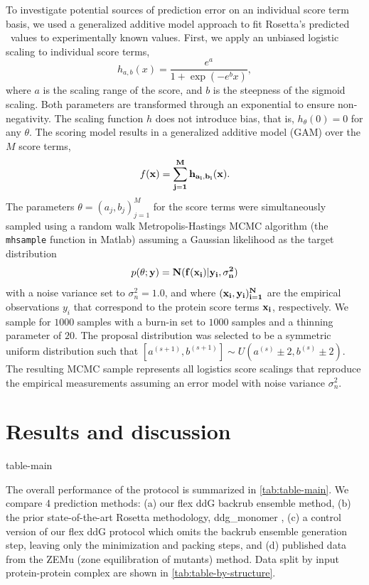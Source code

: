 To investigate potential sources of prediction error on an individual score term basis, we used a generalized additive model\cite{hastie_generalized_1990} approach to fit Rosetta's predicted \ddg\ values to experimentally known values.
First, we apply an unbiased logistic scaling to individual score terms,
$$h_{a,b}(x) = \frac{e^{a}}{1 + \exp(- e^{b} x)},$$
where $a$ is the scaling range of the score, and $b$ is the steepness of the sigmoid scaling. Both parameters are transformed through an exponential to ensure non-negativity. The scaling function $h$ does not introduce bias, that is, $h_\theta(0) = 0$ for any $\theta$. The scoring model results in a generalized additive model (GAM) over the $M$ score terms,
$$f(\bf{x}) = \sum_{j=1}^M h_{a_i,b_i}(x).$$
The parameters $\theta = (a_j,b_j)_{j=1}^M$ for the score terms were simultaneously sampled using a random walk Metropolis-Hastings MCMC algorithm (the \texttt{mhsample} function in Matlab) assuming a Gaussian likelihood as the target distribution
$$p(\theta ; \bf{y}) = N( f(\bf{x}_i) | y_i, \sigma_n^2)$$
with a noise variance set to $\sigma_n^2 = 1.0$, and where $(\bf{x}_i,y_i)_{i=1}^N$ are the empirical observations $y_i$ that correspond to the protein score terms $\bf{x}_i$, respectively. We sample for $1000$ samples with a burn-in set to $1000$ samples and a thinning parameter of $20$. The proposal distribution was selected to be a symmetric uniform distribution such that $[a^{(s+1)},b^{(s+1)}] \sim U( a^{(s)} \pm 2, b^{(s)} \pm 2)$. The resulting MCMC sample represents all logistics score scalings that reproduce the empirical measurements assuming an error model with noise variance $\sigma_n^2$.

\section{Results and discussion}

{table-main}

The overall performance of the protocol is summarized in \cref{tab:table-main}.
We compare 4 prediction methods: (a) our flex ddG backrub ensemble method, (b) the prior state-of-the-art Rosetta methodology, ddg\_monomer \cite{kellogg_role_2011}, (c) a control version of our flex ddG protocol which omits the backrub ensemble generation step, leaving only the minimization and packing steps, and (d) published data from the ZEMu (zone equilibration of mutants) method\cite{dourado_multiscale_2014}. Data split by input protein-protein complex are shown in \cref{tab:table-by-structure}.

